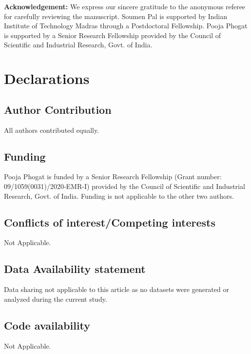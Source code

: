 \documentclass[12pt]{article}
\numberwithin{equation}{section}
\begin{document}
\textbf{Acknowledgement:} We express our sincere gratitude to the anonymous referee for carefully reviewing the manuscript. Soumen Pal is supported by Indian Institute of Technology Madras through a Postdoctoral Fellowship. Pooja Phogat is supported by a Senior Research Fellowship provided by the Council of Scientific and Industrial Research, Govt. of India. \\

\section{Declarations}

\subsection{Author Contribution} All authors contributed equally.

\subsection{Funding} Pooja Phogat is funded by a Senior Research Fellowship (Grant number: 09/1059(0031)/2020-EMR-I) provided by the Council of Scientific and Industrial Research, Govt. of India. Funding is not applicable to the other two authors.

\subsection{Conflicts of interest/Competing interests}
Not Applicable.
\subsection{Data Availability statement} Data sharing not applicable to this article as no datasets were generated or analyzed during the current study.

\subsection{Code availability} Not Applicable.\\
\end{document}
